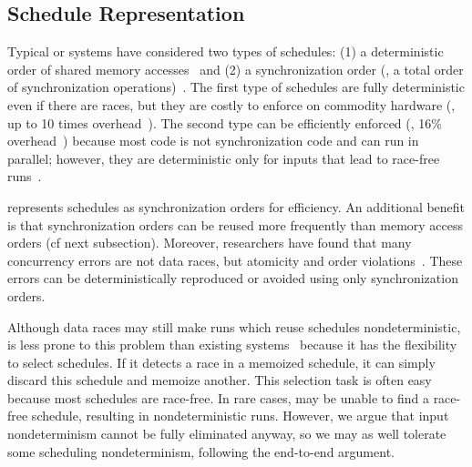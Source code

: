 \subsection{Schedule Representation}
\label{sec:tern-define-schedule}

Typical \smt or \dmt systems have considered two types of schedules: (1) a
deterministic order of shared memory
accesses~\cite{dmp:asplos09,coredet:asplos10} and (2) a synchronization
order (\ie, a total order of synchronization operations)~\cite{kendo:asplos09}. 
The first type of schedules are fully deterministic even if there are races, but
they are costly to enforce on commodity hardware (\eg, up to 10 times
overhead~\cite{coredet:asplos10}).  The second type can be efficiently enforced
(\eg, 16\% overhead~\cite{kendo:asplos09}) because most code is not
synchronization code and can run in parallel; however, they are deterministic
only for inputs that lead to race-free runs~\cite{recplay:tocs,kendo:asplos09}.

\tern represents schedules as synchronization orders for efficiency.  An
additional benefit is that synchronization orders can be reused more
frequently than memory access orders (cf next subsection).
Moreover, researchers have found that many concurrency errors
are not data races, but atomicity and order
violations~\cite{lu:concurrency-bugs}.  These errors can be
deterministically reproduced or avoided using only  synchronization orders.

Although data races may still make runs which reuse schedules nondeterministic,
\tern is less prone to this problem than existing \dmt
systems~\cite{kendo:asplos09} because it has the flexibility to select
schedules.  If it detects a race in a memoized schedule, it can simply
discard this schedule and memoize another.  This selection task is often
easy because most schedules are race-free.  In rare cases, \tern may be
unable to find a race-free schedule, resulting in nondeterministic runs.
However, we argue that input nondeterminism cannot be fully eliminated
anyway, so we may as well tolerate some scheduling nondeterminism,
following the end-to-end argument.



